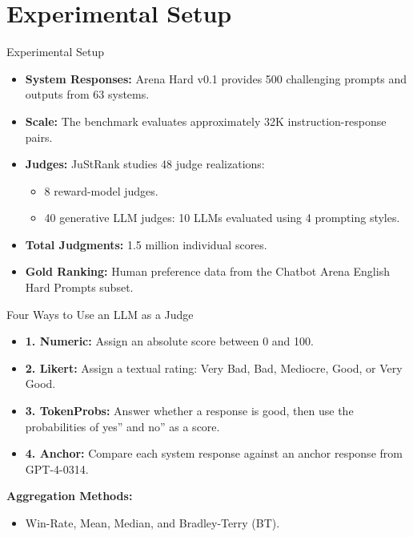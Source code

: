 \documentclass[10pt]{beamer}
\begin{document}
\section{Experimental Setup}

\begin{frame}{Experimental Setup}
	\begin{itemize}
		\item \textbf{System Responses:} Arena Hard v0.1 provides 500 challenging prompts and outputs from 63 systems.
		\item \textbf{Scale:} The benchmark evaluates approximately 32K instruction-response pairs.
		\item \textbf{Judges:} JuStRank studies 48 judge realizations:
		\begin{itemize}
			\item 8 reward-model judges.
			\item 40 generative LLM judges: 10 LLMs evaluated using 4 prompting styles.
		\end{itemize}
		\item \textbf{Total Judgments:} 1.5 million individual scores.
		\item \textbf{Gold Ranking:} Human preference data from the Chatbot Arena English Hard Prompts subset.
	\end{itemize}
\end{frame}

\begin{frame}{Four Ways to Use an LLM as a Judge}
	\begin{itemize}
		\item \textbf{1. Numeric:} Assign an absolute score between 0 and 100.
		\item \textbf{2. Likert:} Assign a textual rating: Very Bad, Bad, Mediocre, Good, or Very Good.
		\item \textbf{3. TokenProbs:} Answer whether a response is good, then use the probabilities of yes'' and no'' as a score.
		\item \textbf{4. Anchor:} Compare each system response against an anchor response from GPT-4-0314.
	\end{itemize}
	
	\vspace{0.3cm}
	\textbf{Aggregation Methods:}
	\begin{itemize}
		\item Win-Rate, Mean, Median, and Bradley-Terry (BT).
	\end{itemize}
\end{frame}
\end{document}
